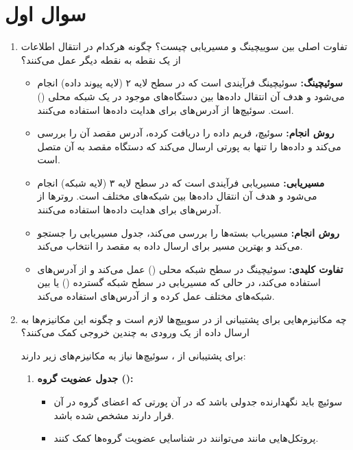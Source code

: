 \section{سوال اول}

\begin{enumerate}
	\item 
	تفاوت اصلی بین سوییچینگ و مسیریابی چیست؟ چگونه هرکدام در انتقال اطلاعات از یک نقطه به نقطه دیگر عمل می‌کنند؟
	
	\begin{qsolve}
		\begin{itemize}
			\item 
			\textbf{سوئیچینگ:} سوئیچینگ فرآیندی است که در سطح لایه ۲ (لایه پیوند داده) انجام می‌شود و هدف آن انتقال داده‌ها بین دستگاه‌های موجود در یک شبکه محلی () است. سوئیچ‌ها از آدرس‌های  برای هدایت داده‌ها استفاده می‌کنند.
			
			
			\item 
			\textbf{روش انجام:} سوئیچ، فریم داده را دریافت کرده، آدرس مقصد آن را بررسی می‌کند و داده‌ها را تنها به پورتی ارسال می‌کند که دستگاه مقصد به آن متصل است.
			
			\item 
			\textbf{مسیریابی:} مسیریابی فرآیندی است که در سطح لایه ۳ (لایه شبکه) انجام می‌شود و هدف آن انتقال داده‌ها بین شبکه‌های مختلف است. روترها از آدرس‌های  برای هدایت داده‌ها استفاده می‌کنند.
			
			\item 
			\textbf{روش انجام:} مسیریاب بسته‌ها را بررسی می‌کند، جدول مسیریابی را جستجو می‌کند و بهترین مسیر برای ارسال داده به مقصد را انتخاب می‌کند.
			
			\item 
			\textbf{تفاوت کلیدی:} سوئیچینگ در سطح شبکه محلی () عمل می‌کند و از آدرس‌های  استفاده می‌کند، در حالی که مسیریابی در سطح شبکه گسترده () یا بین شبکه‌های مختلف عمل کرده و از آدرس‌های  استفاده می‌کند.
		\end{itemize}
	\end{qsolve}
	
	
	\item 
	چه مکانیزم‌هایی برای پشتیبانی از  در سوییچ‌ها لازم است و چگونه این مکانیزم‌ها به ارسال داده از یک ورودی به چندین خروجی کمک می‌کنند؟
	
	\begin{qsolve}
		برای پشتیبانی از ، سوئیچ‌ها نیاز به مکانیزم‌های زیر دارند:
		
		\begin{enumerate}
			\item 
			\textbf{جدول عضویت گروه (\lr{Group Membership Table}):}
			\begin{itemize}
				\item 
				سوئیچ باید نگهدارنده جدولی باشد که در آن پورتی که اعضای گروه  در آن قرار دارند مشخص شده باشد.
				
				\item 
				پروتکل‌هایی مانند  می‌توانند در شناسایی عضویت گروه‌ها کمک کنند.
			\end{itemize}
		\end{enumerate}
	\end{qsolve}
\end{enumerate}
	\newpage
	
